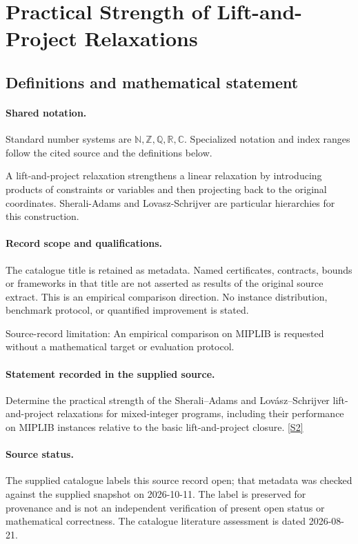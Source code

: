 \documentclass[11pt]{article}
\newcommand{\sref}[2]{\hyperlink{source:#1:#2}{[S#2]}}
\begin{document}
\section{Practical Strength of Lift-and-Project Relaxations}\label{statement}

\subsection{Definitions and mathematical statement}

\paragraph{Shared notation.}Standard number systems are $\mathbb N,\mathbb Z,\mathbb Q,\mathbb R,\mathbb C$. Specialized notation and index ranges follow the cited source and the definitions below.


A lift-and-project relaxation strengthens a linear relaxation by introducing products of constraints or variables and then projecting back to the original coordinates. Sherali-Adams and Lovasz-Schrijver are particular hierarchies for this construction.
\paragraph{Record scope and qualifications.}
The catalogue title is retained as metadata. Named certificates, contracts, bounds or frameworks in that title are not asserted as results of the original source extract.
This is an empirical comparison direction. No instance distribution, benchmark protocol, or quantified improvement is stated.

Source-record limitation: An empirical comparison on MIPLIB is requested without a mathematical target or evaluation protocol.
\paragraph{Statement recorded in the supplied source.}
Determine the practical strength of the Sherali–Adams and Lovász–Schrijver lift-and-project relaxations for mixed-integer programs, including their performance on MIPLIB instances relative to the basic lift-and-project closure. \sref{statement}{2}
\paragraph{Source status.}
The supplied catalogue labels this source record open; that metadata was checked against the supplied snapshot on 2026-10-11. The label is preserved for provenance and is not an independent verification of present open status or mathematical correctness. The catalogue literature assessment is dated 2026-08-21.
\end{document}
